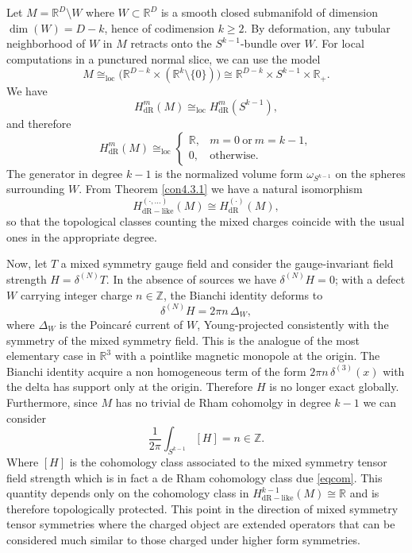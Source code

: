 \documentclass[a4paper,12pt]{article}
\begin{document}
Let \(M = \mathbb{R}^D \setminus W
\)
where \( W \subset \mathbb{R}^D \) is a smooth closed submanifold of dimension 
\(\dim (W) = D-k\), hence of codimension \(k \geq 2\).  By deformation, any tubular neighborhood of \( W \) in \( M \) retracts onto the \( S^{k-1} \)-bundle over \( W \). For local computations in a punctured normal slice, we can use the model
\begin{equation}
M \cong_{\text{loc}} \big(\mathbb{R}^{D-k} \times (\mathbb{R}^k \setminus \{0\})\big) \cong \mathbb{R}^{D-k} \times S^{k-1} \times \mathbb{R}_+ .
\end{equation}
We have
\begin{equation}
H^m_{\mathrm{dR}}(M) \cong_{\text{loc}} H^m_{\mathrm{dR}}(S^{k-1}) ,
\end{equation}
and therefore
\begin{equation}
H^m_{\mathrm{dR}}(M) \cong_{\text{loc}} 
\begin{cases}
\mathbb{R}, & m=0 \ \text{or} \ m=k-1 , \\
0, & \text{otherwise} .
\end{cases}
\end{equation}
The generator in degree \(k-1\) is the normalized volume form \(\omega_{S^{k-1}}\) on the spheres surrounding \( W \). From Theorem \ref{con4.3.1} we have a natural isomorphism
\begin{equation}\label{eqcom}
H^{(\cdot,...)}_{\mathrm{dR-like}}(M) \cong H^{(\cdot)}_{\mathrm{dR}}(M) ,
\end{equation}
so that the topological classes counting the mixed charges coincide with the usual ones in the appropriate degree. 

Now, let $T$ a mixed symmetry  gauge field and consider the gauge-invariant field strength $H = \delta^{(N)} T $. 
In the absence of sources we have \(\delta^{(N)} H=0\); with a defect \( W \) carrying integer charge \( n\in \mathbb{Z}\), the Bianchi identity deforms to
\begin{equation}
\delta^{(N)} H = 2\pi n \, \Delta_W ,
\end{equation}
where \(\Delta_W\) is the Poincaré current of \( W \), Young-projected consistently with the symmetry of the mixed symmetry field. This is the analogue of the most elementary case in $\mathbb{R}^3$ with a pointlike magnetic monopole at the origin. The Bianchi identity acquire a non homogeneous term of the form $2\pi n \, \delta^{(3)}(x) $ with
the delta has support only at the origin. Therefore $H$ is no longer exact globally. Furthermore, since $M$ has no trivial de Rham cohomolgy in degree $k-1$ we can consider
\begin{equation}
\frac{1}{2\pi}\int_{S^{k-1}} [H] = n \in \mathbb{Z}.
\end{equation}
Where $[H]$ is the cohomology class associated to the mixed symmetry tensor field strength which is in fact a de Rham cohomology class due \eqref{eqcom}. This quantity depends only on the cohomology class in \(H^{k-1}_{\mathrm{dR-like}}(M) \cong \mathbb{R}\) and is therefore topologically protected. This point in the direction of mixed symmetry tensor symmetries where the charged object are extended operators that can be considered much similar to those charged under higher form symmetries. 
\end{document}
